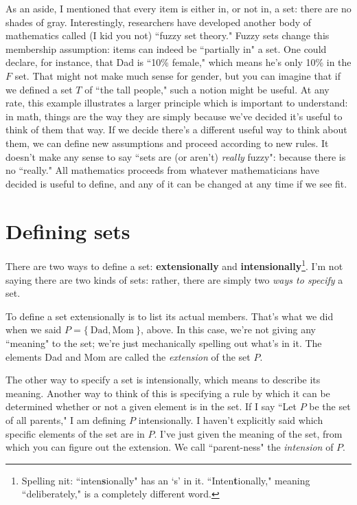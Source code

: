 As an aside, I mentioned that every item is either in, or not in, a set:
there are no shades of gray. Interestingly, researchers have developed
another body of mathematics called (I kid you not) ``fuzzy set theory."
 Fuzzy sets change this membership assumption: items can
indeed be ``partially in" a set. One could declare, for instance, that
Dad is ``10\% female," which means he's only 10\% in the $F$ set. That
might not make much sense for gender, but you can imagine that if we
defined a set $T$ of ``the tall people," such a notion might be useful. At
any rate, this example illustrates a larger principle which is important to
understand: in math, things are the way they are simply because we've
decided it's useful to think of them that way. If we decide there's a
different useful way to think about them, we can define new assumptions and
proceed according to new rules. It doesn't make any sense to say ``sets are
(or aren't) \textit{really} fuzzy": because there is no ``really." All
mathematics proceeds from whatever mathematicians have decided is useful to
define, and any of it can be changed at any time if we see fit.

\section{Defining sets}

There are two ways to define a set: \textbf{extensionally} and
\textbf{intensionally}\footnote{Spelling nit: ``inten\textbf{s}ionally" has
an `s' in it. ``Inten\textbf{t}ionally," meaning ``deliberately," is a
completely different word.}. I'm not saying there are two kinds of sets:
rather, there are simply two \textit{ways to specify} a set.

To define a set extensionally is to list its actual members. That's what we
did when we said $P = \{~\text{Dad}, \text{Mom}~\}$, above. In this
case, we're not giving any ``meaning" to the set; we're just mechanically
spelling out what's in it. The elements Dad and Mom are called the
\textit{extension}  of the set $P$.

The other way to specify a set is intensionally, which means to describe
its meaning. Another way to think of this is specifying a rule by which it
can be determined whether or not a given element is in the set. If I say
``Let $P$ be the set of all parents," I am defining $P$ intensionally. I
haven't explicitly said which specific elements of the set are in $P$. I've
just given the meaning of the set, from which you can figure out the
extension. We call ``parent-ness" the \textit{intension} 
of $P$.


